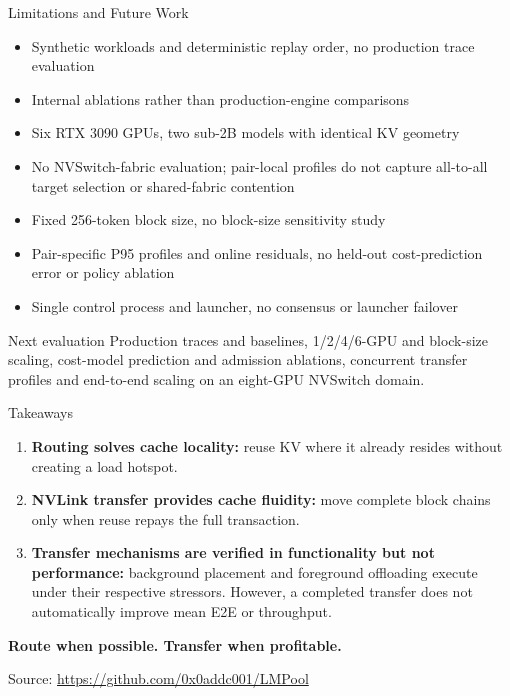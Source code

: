 \documentclass[aspectratio=169,10pt]{beamer}
\newcommand{\metric}[1]{\textcolor{LMBlue}{\bfseries #1}}
\newcommand{\good}[1]{\textcolor{LMGreen}{\bfseries #1}}
\begin{document}
\begin{frame}{Limitations and Future Work}
  \small
  \begin{itemize}
    \item Synthetic workloads and deterministic replay order, no production trace evaluation
    \item Internal ablations rather than production-engine comparisons
    \item Six RTX 3090 GPUs, two sub-2B models with identical KV geometry
    \item No NVSwitch-fabric evaluation; pair-local profiles do not capture all-to-all target selection or shared-fabric contention
    \item Fixed 256-token block size, no block-size sensitivity study
    \item Pair-specific P95 profiles and online residuals, no held-out cost-prediction error or policy ablation
    \item Single control process and launcher, no consensus or launcher failover
  \end{itemize}
  \vspace{0.5em}
  \begin{block}{Next evaluation}
    Production traces and baselines, 1/2/4/6-GPU and block-size scaling, cost-model prediction and admission ablations, concurrent transfer profiles and end-to-end scaling on an eight-GPU NVSwitch domain.
  \end{block}
\end{frame}

\begin{frame}{Takeaways}
  \begin{enumerate}
    \item \metric{Routing solves cache locality:} reuse KV where it already resides without creating a load hotspot.
    \item \metric{NVLink transfer provides cache fluidity:} move complete block chains only when reuse repays the full transaction.
    \item \metric{Transfer mechanisms are verified in functionality but not performance:} background placement and foreground offloading execute under their respective stressors. However, a completed transfer does not automatically improve mean E2E or throughput.
  \end{enumerate}
  \vspace{1em}
  \begin{center}
    \Large\good{Route when possible. Transfer when profitable.}
  \end{center}
  \vfill
  \begin{center}
    \small Source: \url{https://github.com/0x0addc001/LMPool}
  \end{center}
\end{frame}
\end{document}
